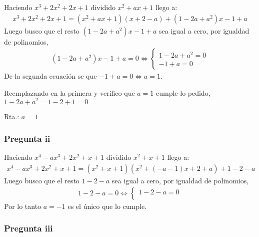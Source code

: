 Haciendo $ x^3 + 2x^2 + 2x + 1 $ dividido $ x^2 + ax + 1 $ llego a:
\begin{align*}
    x^3 + 2x^2 + 2x + 1 = (x^2 + ax + 1)(x + 2 - a) + \left( 1 - 2a + a^2 \right)x -1 + a
\end{align*}
Luego busco que el resto $ \left( 1 - 2a + a^2 \right)x -1 + a $ sea igual a cero, por igualdad de polinomios,
\begin{align*}
    \left( 1 - 2a + a^2 \right)x -1 + a = 0 \iff \begin{cases}
    1 - 2a + a^2 = 0 \\
    -1+a = 0
    \end{cases}
\end{align*}
De la segunda ecuación se que $ -1 + a = 0 \iff a = 1 $.

Reemplazando en la primera y verifico que $ a = 1 $ cumple lo pedido, $ 1-2a+a^2 = 1-2+1 = 0 $

Rta.: $ a = 1 $

\subsubsection{Pregunta ii}

Haciendo $ x^4 - ax^3 + 2x^2 + x + 1 $ dividido $ x^2 + x + 1 $ llego a:
\begin{align*}
    x^4 - ax^3 + 2x^2 + x + 1 = (x^2 + x + 1)(x^2 + (-a-1)x + 2 + a) + 1-2-a
\end{align*}
Luego busco que el resto $ 1-2-a $ sea igual a cero, por igualdad de polinomios,
\begin{align*}
    1-2-a = 0 \iff \begin{cases}
        1-2-a = 0 \\
    \end{cases}
\end{align*}
Por lo tanto $ a = -1 $ es el único que lo cumple. 

\subsubsection{Pregunta iii}

